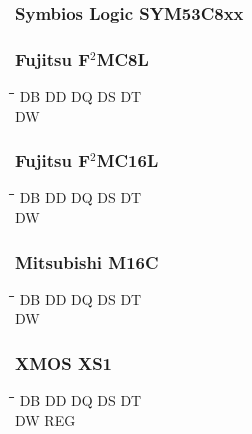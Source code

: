 \subsubsection{Symbios Logic SYM53C8xx}
{\tt\begin{tabbing} 
\end{tabbing}}

\subsubsection{Fujitsu F$^{2}$MC8L}
{\tt\begin{tabbing} 
\hspace{3cm}\=\hspace{3cm}\=\hspace{3cm}\=\hspace{3cm}\=\kill
DB         \> DD          \> DQ          \> DS          \> DT \\
DW \\
\end{tabbing}}

\subsubsection{Fujitsu F$^{2}$MC16L}
{\tt\begin{tabbing} 
\hspace{3cm}\=\hspace{3cm}\=\hspace{3cm}\=\hspace{3cm}\=\kill
DB         \> DD          \> DQ          \> DS          \> DT \\
DW \\
\end{tabbing}}

\subsubsection{Mitsubishi M16C}
{\tt\begin{tabbing}
\hspace{3cm}\=\hspace{3cm}\=\hspace{3cm}\=\hspace{3cm}\=\kill
DB         \> DD          \> DQ          \> DS          \> DT \\
DW \\
\end{tabbing}}

\subsubsection{XMOS XS1}
{\tt\begin{tabbing}
\hspace{3cm}\=\hspace{3cm}\=\hspace{3cm}\=\hspace{3cm}\=\kill
DB         \> DD          \> DQ          \> DS          \> DT \\
DW         \> REG \\
\end{tabbing}}
